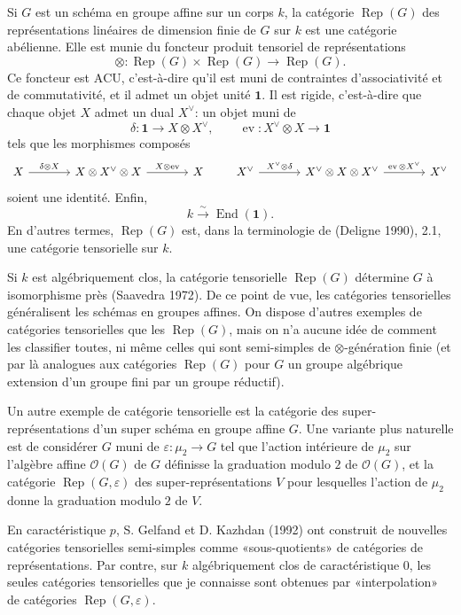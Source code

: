 \documentclass[11pt]{article}
\newcommand{\Rep}{\operatorname{Rep}}
\newcommand{\End}{\operatorname{End}}
\newcommand{\ev}{\operatorname{ev}}
\newcommand{\ACU}{\mathrm{ACU}}
\newcommand{\muTwo}{\mu_2}
\theoremstyle{deligne}
\begin{document}
Si \(G\) est un schéma en groupe affine sur un corps \(k\), la catégorie \(\Rep(G)\) des représentations linéaires de dimension finie de \(G\) sur \(k\) est une catégorie abélienne. Elle est munie du foncteur produit tensoriel de représentations
\[
  \otimes:\Rep(G)\times \Rep(G)\longrightarrow \Rep(G).
\]
Ce foncteur est \(\ACU\), c'est-à-dire qu'il est muni de contraintes d'associativité et de commutativité, et il admet un objet unité \(\mathbf 1\). Il est rigide, c'est-à-dire que chaque objet \(X\) admet un dual \(X^\vee\): un objet muni de
\[
  \delta:\mathbf 1\longrightarrow X\otimes X^\vee,\qquad
  \ev:X^\vee\otimes X\longrightarrow \mathbf 1
\]
tels que les morphismes composés
\[
\begin{tikzcd}[column sep=large]
X \arrow[r,"\delta\otimes X"] &
X\otimes X^\vee\otimes X \arrow[r,"X\otimes \ev"] &
X
\end{tikzcd}
\qquad
\begin{tikzcd}[column sep=large]
X^\vee \arrow[r,"X^\vee\otimes\delta"] &
X^\vee\otimes X\otimes X^\vee \arrow[r,"\ev\otimes X^\vee"] &
X^\vee
\end{tikzcd}
\]
soient une identité. Enfin,
\[
  k\overset{\sim}{\longrightarrow}\End(\mathbf 1).
\]
En d'autres termes, \(\Rep(G)\) est, dans la terminologie de (Deligne 1990), 2.1, une catégorie tensorielle sur \(k\).

Si \(k\) est algébriquement clos, la catégorie tensorielle \(\Rep(G)\) détermine \(G\) à isomorphisme près (Saavedra 1972). De ce point de vue, les catégories tensorielles généralisent les schémas en groupes affines. On dispose d'autres exemples de catégories tensorielles que les \(\Rep(G)\), mais on n'a aucune idée de comment les classifier toutes, ni même celles qui sont semi-simples de \(\otimes\)-génération finie (et par là analogues aux catégories \(\Rep(G)\) pour \(G\) un groupe algébrique extension d'un groupe fini par un groupe réductif).

Un autre exemple de catégorie tensorielle est la catégorie des super-représentations d'un super schéma en groupe affine \(G\). Une variante plus naturelle est de considérer \(G\) muni de \(\varepsilon:\muTwo\to G\) tel que l'action intérieure de \(\muTwo\) sur l'algèbre affine \(\mathcal O(G)\) de \(G\) définisse la graduation modulo \(2\) de \(\mathcal O(G)\), et la catégorie \(\Rep(G,\varepsilon)\) des super-représentations \(V\) pour lesquelles l'action de \(\muTwo\) donne la graduation modulo \(2\) de \(V\).

En caractéristique \(p\), S. Gelfand et D. Kazhdan (1992) ont construit de nouvelles catégories tensorielles semi-simples comme «sous-quotients» de catégories de représentations. Par contre, sur \(k\) algébriquement clos de caractéristique \(0\), les seules catégories tensorielles que je connaisse sont obtenues par «interpolation» de catégories \(\Rep(G,\varepsilon)\).
\end{document}
